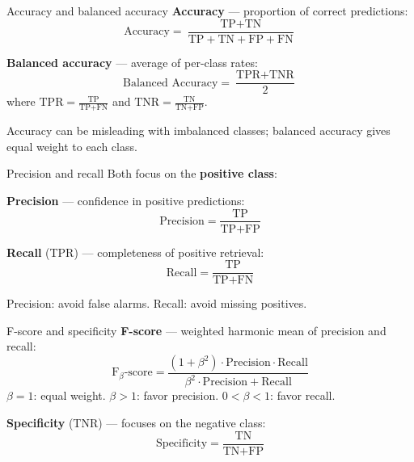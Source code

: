 \begin{frame}{Accuracy and balanced accuracy}
  \textbf{Accuracy} --- proportion of correct predictions:
  \[
    \text{Accuracy} = \frac{\text{TP} + \text{TN}}
      {\text{TP} + \text{TN} + \text{FP} + \text{FN}}
  \]

  \vspace{0.2cm}
  \textbf{Balanced accuracy} --- average of per-class rates:
  \[
    \text{Balanced Accuracy} = \frac{\text{TPR} + \text{TNR}}{2}
  \]
  where $\text{TPR} = \frac{\text{TP}}{\text{TP} + \text{FN}}$ and
  $\text{TNR} = \frac{\text{TN}}{\text{TN} + \text{FP}}$.

  \vspace{0.2cm}
  \small
  Accuracy can be misleading with imbalanced classes; balanced accuracy
  gives equal weight to each class.
\end{frame}

\begin{frame}{Precision and recall}
  Both focus on the \textbf{positive class}:

  \vspace{0.3cm}
  \textbf{Precision} --- confidence in positive predictions:
  \[
    \text{Precision} = \frac{\text{TP}}{\text{TP} + \text{FP}}
  \]

  \vspace{0.2cm}
  \textbf{Recall} (TPR) --- completeness of positive retrieval:
  \[
    \text{Recall} = \frac{\text{TP}}{\text{TP} + \text{FN}}
  \]

  \vspace{0.2cm}
  \small
  Precision: avoid false alarms. Recall: avoid missing positives.
\end{frame}

\begin{frame}{F-score and specificity}
  \textbf{F-score} --- weighted harmonic mean of precision and recall:
  \[
    \text{F}_\beta\text{-score} =
      \frac{(1 + \beta^2) \cdot \text{Precision} \cdot \text{Recall}}
        {\beta^2 \cdot \text{Precision} + \text{Recall}}
  \]
  $\beta = 1$: equal weight. $\beta > 1$: favor precision.
  $0 < \beta < 1$: favor recall.

  \vspace{0.3cm}
  \textbf{Specificity} (TNR) --- focuses on the negative class:
  \[
    \text{Specificity} = \frac{\text{TN}}{\text{TN} + \text{FP}}
  \]
\end{frame}

